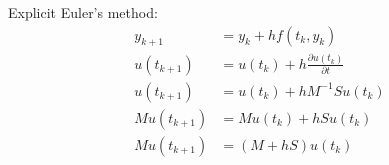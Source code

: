 \documentclass{article}
\begin{document}
%
Explicit Euler's method:
\begin{align}
  y_{k+1} &= y_k + hf(t_k, y_k) \\
  u(t_{k+1}) &= u(t_k) + h \frac{\partial u(t_k)}{\partial t} \\
  u(t_{k+1}) &= u(t_k) + h M^{-1} S u(t_k) \\
  M u(t_{k+1}) &= M u(t_k) + h S u(t_k) \\
  M u(t_{k+1}) &= (M + hS) u(t_k)
\end{align}
\end{document}
